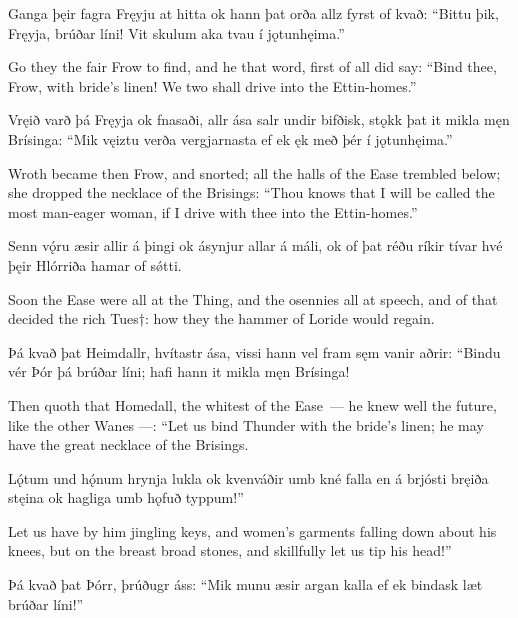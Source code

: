 Ganga þęir fagra \hld Fręyju at hitta
ok hann þat orða \hld allz fyrst of kvað:
“Bittu þik, Fręyja, \hld brúðar líni!
Vit skulum aka tvau \hld í jǫtunhęima.”

Go they the fair Frow to find, and he that word, first of all did say: “Bind thee, Frow, with bride’s linen\footnotemark[1]! We two shall drive into the Ettin-homes.”

Vręið varð þá Fręyja \hld ok fnasaði,
allr ása salr \hld undir bifðisk,
stǫkk þat it mikla \hld męn Brísinga:
“Mik vęiztu verða \hld vergjarnasta
ef ek ęk með þér \hld í jǫtunhęima.”

Wroth became then Frow, and snorted; all the halls of the Ease trembled below; she dropped the necklace of the Brisings: “Thou knows that I will be called the most man-eager woman, if I drive with thee into the Ettin-homes.”

Senn vǫ́ru æsir \hld allir á þingi
ok ásynjur \hld allar á máli,
ok of þat réðu \hld ríkir tívar
hvé þęir Hlórriða \hld hamar of sǿtti.

Soon the Ease were all at the Thing, and the osennies all at speech, and of that decided the rich Tues†: how they the hammer of Loride would regain\footnotemark[1].

Þá kvað þat Heimdallr, \hld hvítastr ása,
vissi hann vel fram \hld sęm vanir aðrir:
“Bindu vér Þór þá \hld brúðar líni;
hafi hann it mikla \hld męn Brísinga!

Then quoth that Homedall, the whitest of the Ease — he knew well the future, like the other Wanes —: “Let us bind Thunder with the bride’s linen; he may have the great necklace of the Brisings.

Lǫ́tum und hǫ́num \hld hrynja lukla
ok kvenváðir \hld umb kné falla
en á brjósti \hld bręiða stęina
ok hagliga \hld umb hǫfuð typpum!”

Let us have by him jingling keys\footnotemark[1], and women’s garments falling down about his knees, but on the breast broad stones\footnotemark[2], and skillfully let us tip his head!\footnotemark[3]”

Þá kvað þat Þórr, \hld þrúðugr áss:
“Mik munu æsir \hld argan kalla
ef ek bindask læt \hld brúðar líni!”

